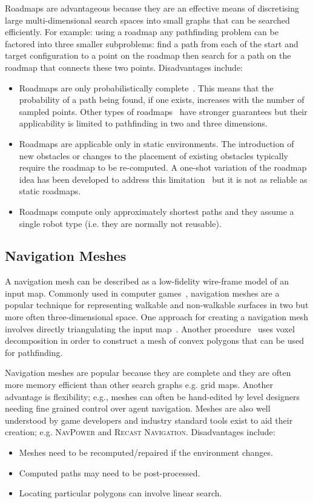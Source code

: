 Roadmaps are advantageous because they are an effective means of discretising
large multi-dimensional search spaces into small graphs that can be searched
efficiently. For example: using a roadmap any pathfinding problem can be
factored into three smaller subproblems: find a path from each of the start and
target configuration to a point on the roadmap then search for a path on the
roadmap that connects these two points. Disadvantages include:
\begin{itemize}
\item{Roadmaps are only probabilistically complete~\citep{barraquand97}. 
This means that the probability of a path being found, if one exists, 
increases with the number of sampled points.
Other types of roadmaps~\citep{geraerts05} have stronger guarantees but their
applicability is limited to pathfinding in two and three dimensions.}
\item{Roadmaps are applicable only in static environments. The introduction of
new obstacles or changes to the placement of existing obstacles typically require 
the roadmap to be re-computed. A one-shot variation of the roadmap idea has been
developed to address this limitation~\citep{lavalle98} but it is not as reliable
as static roadmaps.}
\item{Roadmaps compute only approximately shortest paths and they assume a single 
robot type (i.e. they are normally not reusable).}
\end{itemize}

\subsection{Navigation Meshes}
\label{cha::lit::graphs::nav}
A navigation mesh can be described as a low-fidelity wire-frame model of an input
map. Commonly used in computer games~\citep{snook00,tozour02}, navigation meshes are a
popular technique for representing walkable and non-walkable surfaces in two but
more often three-dimensional space.  One approach for creating a navigation mesh
involves directly triangulating the input map~\citep{demyen07,kallmann10}.  
Another procedure~\cite{mononen09} uses voxel decomposition in order to construct a 
mesh of convex polygons that can be used for pathfinding.

Navigation meshes are popular because they are complete and they are often more
memory efficient than other search graphs e.g. grid maps. Another advantage is
flexibility; e.g., meshes can often be hand-edited by level designers needing
fine grained control over agent navigation. Meshes are also well understood by 
game developers and industry standard tools exist to aid their creation; 
e.g. \textsc{NavPower} and \textsc{Recast Navigation}. Disadvantages include: 
\begin{itemize}
\item Meshes need to be recomputed/repaired if the environment changes.
\item Computed paths may need to be post-processed.
\item Locating particular polygons can involve linear search.
\end{itemize}

